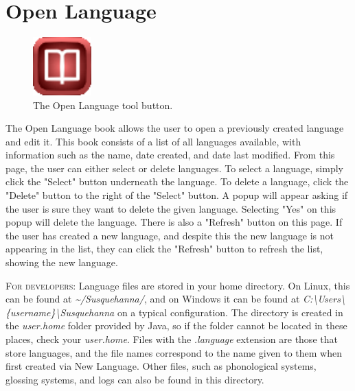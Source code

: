 \documentclass{report}
\begin{document}
	\section{Open Language}
	\begin{figure}
		\centering
		\includegraphics[width=0.2\textwidth]{img/open-language}
		\caption{The Open Language tool button.}
		\label{fig:open-language}
	\end{figure}
	The Open Language book allows the user to open a previously created language and edit it. This book consists of a list of all languages available, with information such as the name, date created, and date last modified. From this page, the user can either select or delete languages. To select a language, simply click the "Select" button underneath the language. To delete a language, click the "Delete" button to the right of the "Select" button. A popup will appear asking if the user is sure they want to delete the given language. Selecting "Yes" on this popup will delete the language. There is also a "Refresh" button on this page. If the user has created a new language, and despite this the new language is not appearing in the list, they can click the "Refresh" button to refresh the list, showing the new language.
	\begin{tcolorbox}[width=1\textwidth]
		\textsc{For developers:} Language files are stored in your home directory. On Linux, this can be found at \emph{\textasciitilde/Susquehanna/}, and on Windows it can be found at \emph{C:{\textbackslash}Users{\textbackslash}\{username\}{\textbackslash}Susquehanna} on a typical configuration. The directory is created in the \emph{user.home} folder provided by Java, so if the folder cannot be located in these places, check your \emph{user.home}. Files with the \emph{.language} extension are those that store languages, and the file names correspond to the name given to them when first created via New Language. Other files, such as phonological systems, glossing systems, and logs can also be found in this directory.
	\end{tcolorbox}
\end{document}
